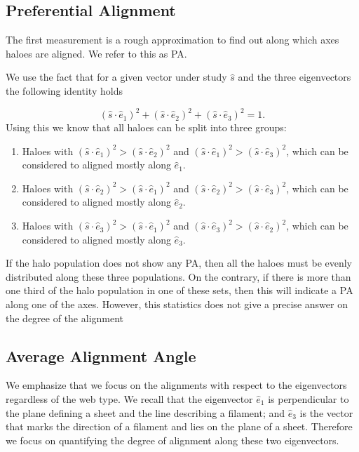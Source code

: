 \documentclass[useAMS,usenatbib]{mn2e}
\begin{document}
\subsection{Preferential Alignment}

The first measurement is a rough approximation to find out along which
axes haloes are aligned. We refer to this as PA.

We use the fact that for a given vector under study $\hat{s}$ and the
three eigenvectors the following identity holds 
 
\begin{equation}
(\hat{s}\cdot\hat{e}_1)^2 +(\hat{s}\cdot\hat{e}_2)^2 +(\hat{s}\cdot\hat{e}_3)^2 =1.
\end{equation}
%
Using this we know that all haloes can be split into three groups:

\begin{enumerate}
\item Haloes with $(\hat{s}\cdot\hat{e}_1)^2> (\hat{s}\cdot\hat{e}_2)^2$
  and $(\hat{s}\cdot\hat{e}_1)^2> (\hat{s}\cdot\hat{e}_3)^2$, which can
  be considered to aligned mostly along $\hat{e}_1$.
\item Haloes with $(\hat{s}\cdot\hat{e}_2)^2> (\hat{s}\cdot\hat{e}_1)^2$
  and $(\hat{s}\cdot\hat{e}_2)^2> (\hat{s}\cdot\hat{e}_3)^2$, which can
  be considered to aligned mostly along $\hat{e}_2$.
\item Haloes with $(\hat{s}\cdot\hat{e}_3)^2> (\hat{s}\cdot\hat{e}_1)^2$
  and $(\hat{s}\cdot\hat{e}_3)^2> (\hat{s}\cdot\hat{e}_2)^2$, which can
  be considered to aligned mostly along $\hat{e}_3$.
\end{enumerate}

If the halo population does not show any PA, then
all the haloes must be evenly distributed along these three
populations. On the contrary, if there is more than one third of the
halo population in one of these sets, then this will indicate a
PA along one of the axes. However, this statistics
does not give a precise answer on the degree of the alignment


\subsection{Average Alignment Angle}

We emphasize that we focus on the alignments with respect to the
eigenvectors regardless of the web type. We recall that the
eigenvector $\hat{e}_1$ is perpendicular to the plane defining a sheet
and the line describing a filament; and $\hat{e}_3$ is the vector that
marks the direction of a filament and lies on the plane of a
sheet. Therefore we focus on quantifying the degree of alignment along
these two eigenvectors. 
\end{document}
